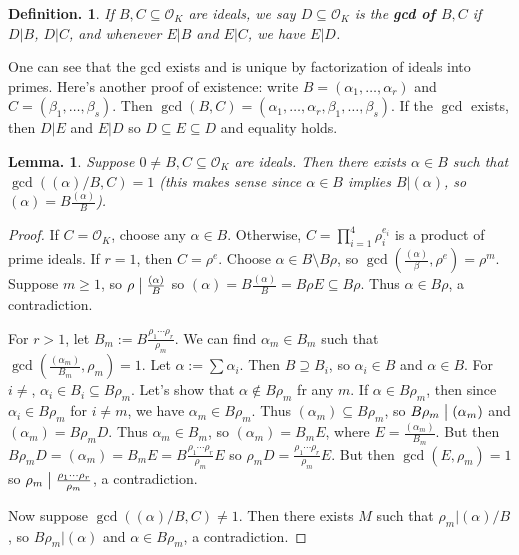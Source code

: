 \documentclass[11pt, a4paper]{memoir}
\renewcommand{\div}{\bigm|}
\theoremstyle{change}
\newtheorem{lemma}[theorem]{Lemma.}
\theoremstyle{plain}
\theoremstyle{nonumberplain}
\newtheorem{definition}{Definition.}
\newtheorem{proof}{Proof}
\numberwithin{equation}{section}
\begin{document}
\begin{definition}
    If $B,C\subseteq\mathcal{O}_K$ are ideals, we say $D\subseteq\mathcal{O}_K$ is the \textbf{gcd of $B,C$} if $D|B$, $D|C$, and whenever $E|B$ and $E|C$, we have $E|D$.
\end{definition}
One can see that the gcd exists and is unique by factorization of ideals into primes.
Here's another proof of existence: write $B=(\alpha_1,\ldots,\alpha_r)$ and $C=(\beta_1,\ldots,\beta_s)$.
Then $\gcd(B,C)=(\alpha_1,\ldots,\alpha_r,\beta_1,\ldots,\beta_s)$.
If the $\gcd$ exists, then $D|E$ and $E|D$ so $D\subseteq E\subseteq D$ and equality holds.
\begin{lemma}
    Suppose $0\neq B,C\subseteq\mathcal{O}_K$ are ideals.
    Then there exists $\alpha\in B$ such that $\gcd((\alpha)/B,C)=1$ (this makes sense since $\alpha\in B$ implies $B|(\alpha)$, so $(\alpha)=B\frac{(\alpha)}{B}$).
\end{lemma}
\begin{proof}
    If $C=\mathcal{O}_K$, choose any $\alpha\in B$.
    Otherwise, $C=\prod_{i=1}^4\rho_i^{e_i}$ is a product of prime ideals.
    If $r=1$, then $C=\rho^e$.
    Choose $\alpha\in B\setminus B\rho$, so $\gcd\left(\frac{(\alpha)}{\beta},\rho^e\right)=\rho^m$.
    Suppose $m\geq 1$, so $\rho\div\frac{(\alpha)}{B}$ so $(\alpha)=B\frac{(\alpha)}{B}=B\rho E\subseteq B\rho$.
    Thus $\alpha\in B\rho$, a contradiction.

    For $r>1$, let $B_m:=B\frac{\rho_1\cdots\rho_r}{\rho_m}$.
    We can find $\alpha_m\in B_m$ such that $\gcd\left(\frac{(\alpha_m)}{B_m},\rho_m\right)=1$.
    Let $\alpha:=\sum\alpha_i$.
    Then $B\supseteq B_i$, so $\alpha_i\in B$ and $\alpha\in B$.
    For $i\neq $, $\alpha_i\in B_i\subseteq B\rho_m$.
    Let's show that $\alpha\notin B\rho_m$ fr any $m$.
    If $\alpha\in B\rho_m$, then since $\alpha_i\in B\rho_m$ for $i\neq m$, we have $\alpha_m\in B\rho_m$.
    Thus $(\alpha_m)\subseteq B\rho_m$, so $B\rho_m\div(\alpha_m)$ and $(\alpha_m)=B\rho_mD$.
    Thus $\alpha_m\in B_m$, so $(\alpha_m)=B_mE$, where $E=\frac{(\alpha_m)}{B_m}$.
    But then $B\rho_mD=(\alpha_m)=B_mE=B\frac{\rho_1\cdots\rho_r}{\rho_m}E$ so $\rho_mD=\frac{\rho_1\cdots\rho_r}{\rho_m}E$.
    But then $\gcd(E,\rho_m)=1$ so $\rho_m\div\frac{\rho_1\cdots\rho_r}{\rho_m}$, a contradiction.

    Now suppose $\gcd((\alpha)/B,C)\neq 1$.
    Then there exists $M$ such that $\rho_m|(\alpha)/B$, so $B\rho_m|(\alpha)$ and $\alpha\in B\rho_m$, a contradiction.
\end{proof}
\end{document}

